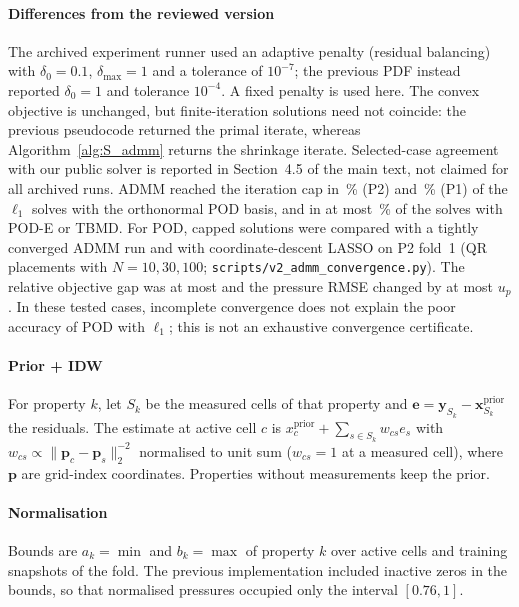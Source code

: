 \paragraph{Differences from the reviewed version} The archived experiment runner used an adaptive penalty (residual balancing) with $\delta_0=0.1$, $\delta_{\max}=1$ and a tolerance of $10^{-7}$; the previous PDF instead reported $\delta_0=1$ and tolerance $10^{-4}$. A fixed penalty is used here. The convex objective is unchanged, but finite-iteration solutions need not coincide: the previous pseudocode returned the primal iterate, whereas Algorithm~\ref{alg:S_admm} returns the shrinkage iterate. Selected-case agreement with our public solver is reported in Section~4.5 of the main text, not claimed for all archived runs. ADMM reached the iteration cap in \VTwoCapPodPTwo\,\% (P2) and \VTwoCapPodPOne\,\% (P1) of the $\ell_1$ solves with the orthonormal POD basis, and in at most \VTwoCapOtherMax\,\% of the solves with POD-E or TBMD. For POD, capped solutions were compared with a tightly converged ADMM run and with coordinate-descent LASSO on P2 fold~1 (QR placements with $N=10,30,100$; \texttt{scripts/v2\_admm\_convergence.py}). The relative objective gap was at most \VTwoObjGapMax{} and the pressure RMSE changed by at most \VTwoRmseDiffMax{} $u_p$. In these tested cases, incomplete convergence does not explain the poor accuracy of POD with $\ell_1$; this is not an exhaustive convergence certificate.

\paragraph{Prior + IDW} For property $k$, let $S_k$ be the measured cells of that property and $\mathbf{e}=\mathbf{y}_{S_k}-\mathbf{x}^{\mathrm{prior}}_{S_k}$ the residuals. The estimate at active cell $c$ is $x^{\mathrm{prior}}_c+\sum_{s\in S_k}w_{cs}e_s$ with $w_{cs}\propto\|\mathbf{p}_c-\mathbf{p}_s\|_2^{-2}$ normalised to unit sum ($w_{cs}=1$ at a measured cell), where $\mathbf{p}$ are grid-index coordinates. Properties without measurements keep the prior.

\paragraph{Normalisation} Bounds are $a_k=\min$ and $b_k=\max$ of property $k$ over active cells and training snapshots of the fold. The previous implementation included inactive zeros in the bounds, so that normalised pressures occupied only the interval $[0.76,1]$.

